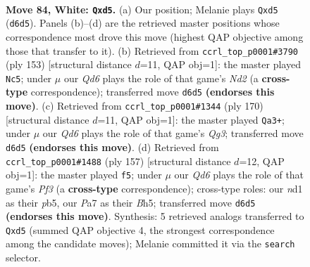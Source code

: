 \documentclass[11pt]{article}
\begin{document}
\clearpage

\begin{figure}[p]\centering
\begin{subfigure}{0.46\textwidth}\centering
\resizebox{\linewidth}{!}{%
\newchessgame
\chessboard[
  setfen={7k/P7/3Q4/3b4/5K2/8/8/3n4 w - - 5 84},
  showmover=false,
  pgfstyle=straightmove, color=movearrow, markmove={d6-d5}
]}
\caption{}
\end{subfigure}\hfill
\begin{subfigure}{0.46\textwidth}\centering
\resizebox{\linewidth}{!}{%
\newchessgame
\chessboard[
  setfen={8/3n2N1/8/7p/5k1B/8/4K3/8 b - - 3 77},
  showmover=false,
  pgfstyle=straightmove, color=movearrow, markmove={d7-c5}
]}
\caption{}
\end{subfigure}
\\[4pt]
\begin{subfigure}{0.46\textwidth}\centering
\resizebox{\linewidth}{!}{%
\newchessgame
\chessboard[
  setfen={8/2K5/5N2/8/k7/6Q1/4B3/8 w - - 3 86},
  showmover=false,
  pgfstyle=straightmove, color=movearrow, markmove={g3-a3}
]}
\caption{}
\end{subfigure}\hfill
\begin{subfigure}{0.46\textwidth}\centering
\resizebox{\linewidth}{!}{%
\newchessgame
\chessboard[
  setfen={8/8/5p2/1P1k3b/8/8/8/4K1B1 b - - 2 79},
  showmover=false,
  pgfstyle=straightmove, color=movearrow, markmove={f6-f5}
]}
\caption{}
\end{subfigure}
\caption{\textbf{Move 84, White: \texttt{Qxd5}.} (a) Our position; Melanie plays \texttt{Qxd5} (\texttt{d6d5}). Panels (b)--(d) are the retrieved master positions whose correspondence most drove this move (highest QAP objective among those that transfer to it). (b) Retrieved from \texttt{ccrl\_top\_p0001\#3790} (ply 153) [structural distance $d$=11, QAP obj=1]: the master played \texttt{Nc5}; under $\mu$ our \emph{Qd6} plays the role of that game's \emph{Nd2} (a \textbf{cross-type} correspondence); transferred move \texttt{d6d5} \textbf{(endorses this move)}. (c) Retrieved from \texttt{ccrl\_top\_p0001\#1344} (ply 170) [structural distance $d$=11, QAP obj=1]: the master played \texttt{Qa3+}; under $\mu$ our \emph{Qd6} plays the role of that game's \emph{Qg3}; transferred move \texttt{d6d5} \textbf{(endorses this move)}. (d) Retrieved from \texttt{ccrl\_top\_p0001\#1488} (ply 157) [structural distance $d$=12, QAP obj=1]: the master played \texttt{f5}; under $\mu$ our \emph{Qd6} plays the role of that game's \emph{Pf3} (a \textbf{cross-type} correspondence); cross-type roles: our \emph{n}d1 as their \emph{p}b5, our \emph{P}a7 as their \emph{B}h5; transferred move \texttt{d6d5} \textbf{(endorses this move)}. Synthesis: 5 retrieved analogs transferred to \texttt{Qxd5} (summed QAP objective 4, the strongest correspondence among the candidate moves); Melanie committed it via the \texttt{search} selector.}
\label{fig:thought-m166}
\end{figure}
\end{document}
